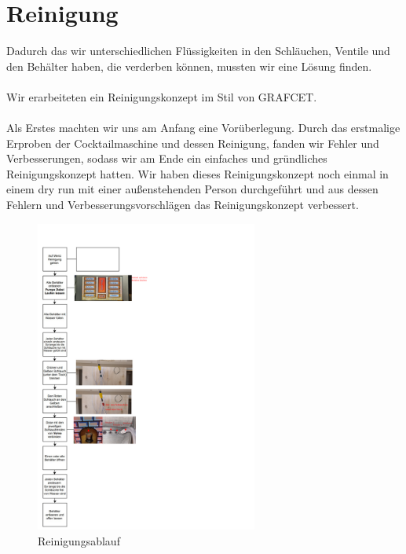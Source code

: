 \documentclass[10pt,a4paper]{report}
\begin{document}
	\chapter{Reinigung}
	Dadurch das wir unterschiedlichen Flüssigkeiten in den Schläuchen, Ventile und den Behälter
	haben, die verderben können, mussten wir eine Lösung finden.\\\\
	Wir erarbeiteten ein Reinigungskonzept im Stil von GRAFCET.\\\\
	Als Erstes machten wir uns am Anfang eine Vorüberlegung.
	Durch das erstmalige Erproben der Cocktailmaschine und dessen Reinigung, fanden wir Fehler und
	Verbesserungen, sodass wir am Ende ein einfaches und gründliches Reinigungskonzept hatten.
	Wir haben dieses Reinigungskonzept noch einmal in einem dry run mit einer außenstehenden
	Person durchgeführt und aus dessen Fehlern und Verbesserungsvorschlägen das Reinigungskonzept
	verbessert.
	\begin{figure}[htb]
		\includegraphics[width=0.65\textwidth]{Sauber zauber.pdf}
		\centering
		\caption{Reinigungsablauf}
	\end{figure} 
	
\end{document}
